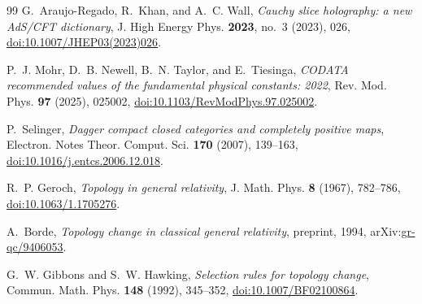 \documentclass[11pt,a4paper,reqno]{amsart}
\theoremstyle{definition}
\numberwithin{equation}{section}
\begin{document}
\begin{thebibliography}{99}
G.~Araujo-Regado, R.~Khan, and A.~C. Wall,
\emph{Cauchy slice holography: a new AdS/CFT dictionary},
J. High Energy Phys. \textbf{2023}, no.~3 (2023), 026,
\href{https://doi.org/10.1007/JHEP03(2023)026}{doi:10.1007/JHEP03(2023)026}.

P.~J. Mohr, D.~B. Newell, B.~N. Taylor, and E.~Tiesinga,
\emph{CODATA recommended values of the fundamental physical constants: 2022},
Rev. Mod. Phys. \textbf{97} (2025), 025002,
\href{https://doi.org/10.1103/RevModPhys.97.025002}{doi:10.1103/RevModPhys.97.025002}.

P.~Selinger,
\emph{Dagger compact closed categories and completely positive maps},
Electron. Notes Theor. Comput. Sci. \textbf{170} (2007), 139--163,
\href{https://doi.org/10.1016/j.entcs.2006.12.018}{doi:10.1016/j.entcs.2006.12.018}.

R.~P. Geroch,
\emph{Topology in general relativity},
J. Math. Phys. \textbf{8} (1967), 782--786,
\href{https://doi.org/10.1063/1.1705276}{doi:10.1063/1.1705276}.

A.~Borde,
\emph{Topology change in classical general relativity},
preprint, 1994,
arXiv:\href{https://arxiv.org/abs/gr-qc/9406053}{gr-qc/9406053}.

G.~W. Gibbons and S.~W. Hawking,
\emph{Selection rules for topology change},
Commun. Math. Phys. \textbf{148} (1992), 345--352,
\href{https://doi.org/10.1007/BF02100864}{doi:10.1007/BF02100864}.

\end{thebibliography}
\end{document}
